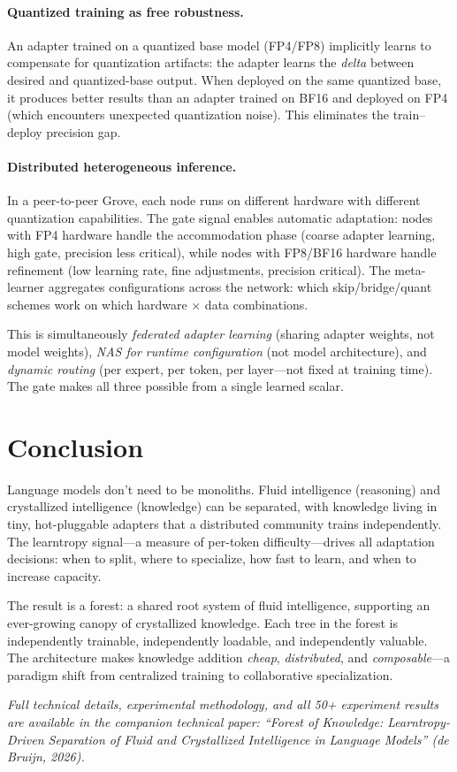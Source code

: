 \documentclass[11pt]{article}
\begin{document}
\paragraph{Quantized training as free robustness.}
An adapter trained on a quantized base model (FP4/FP8) implicitly learns
to compensate for quantization artifacts: the adapter learns the
\emph{delta} between desired and quantized-base output. When deployed on
the same quantized base, it produces better results than an adapter
trained on BF16 and deployed on FP4 (which encounters unexpected
quantization noise). This eliminates the train--deploy precision gap.

\paragraph{Distributed heterogeneous inference.}
In a peer-to-peer Grove, each node runs on different hardware with
different quantization capabilities. The gate signal enables automatic
adaptation: nodes with FP4 hardware handle the accommodation phase
(coarse adapter learning, high gate, precision less critical), while
nodes with FP8/BF16 hardware handle refinement (low learning rate, fine
adjustments, precision critical). The meta-learner aggregates
configurations across the network: which skip/bridge/quant schemes work
on which hardware $\times$ data combinations.

This is simultaneously \emph{federated adapter learning} (sharing adapter
weights, not model weights), \emph{NAS for runtime configuration} (not
model architecture), and \emph{dynamic routing} (per expert, per token,
per layer---not fixed at training time). The gate makes all three possible
from a single learned scalar.

\section{Conclusion}

Language models don't need to be monoliths. Fluid intelligence (reasoning)
and crystallized intelligence (knowledge) can be separated, with knowledge
living in tiny, hot-pluggable adapters that a distributed community trains
independently. The learntropy signal---a measure of per-token
difficulty---drives all adaptation decisions: when to split, where to
specialize, how fast to learn, and when to increase capacity.

The result is a forest: a shared root system of fluid intelligence,
supporting an ever-growing canopy of crystallized knowledge. Each tree in
the forest is independently trainable, independently loadable, and
independently valuable. The architecture makes knowledge addition
\emph{cheap}, \emph{distributed}, and \emph{composable}---a paradigm shift
from centralized training to collaborative specialization.

\vspace{12pt}
\noindent\emph{Full technical details, experimental methodology, and all
50+ experiment results are available in the companion technical paper:
``Forest of Knowledge: Learntropy-Driven Separation of Fluid and
Crystallized Intelligence in Language Models'' (de Bruijn, 2026).}
\end{document}
